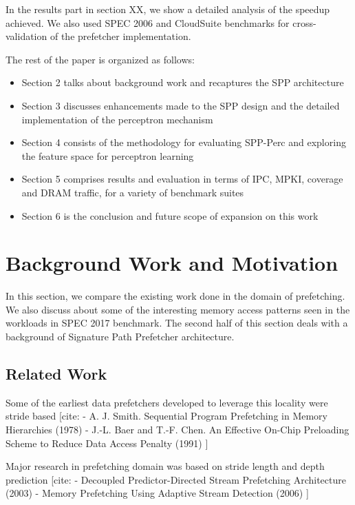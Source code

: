\documentclass{sig-alternate}
\begin{document}
In the results part in section XX, we show a detailed analysis of the speedup achieved.
We also used SPEC 2006 and CloudSuite benchmarks for cross-validation of the prefetcher implementation.

\vspace{1ex}The rest of the paper is organized as follows:

\begin{itemize}
\item Section 2 talks about background work and recaptures the SPP architecture
\item Section 3 discusses enhancements made to the SPP design and the detailed implementation of the perceptron mechanism
\item Section 4 consists of the methodology for evaluating SPP-Perc and exploring the feature space for perceptron learning
\item Section 5 comprises results and evaluation in terms of IPC, MPKI, coverage and DRAM traffic, for a variety of benchmark suites
\item Section 6 is the conclusion and future scope of expansion on this work
\end{itemize}

\section{Background Work and Motivation}

In this section, we compare the existing work done in the domain of prefetching. 
We also discuss about some of the interesting memory access patterns seen in the workloads in SPEC 2017 benchmark. 
The second half of this section deals with a background of Signature Path Prefetcher architecture.

\subsection{Related Work}
Some of the earliest data prefetchers developed to leverage this locality were stride based [cite:\newline
- A. J. Smith. Sequential Program Prefetching in Memory Hierarchies (1978)\newline
- J.-L. Baer and T.-F. Chen. An Effective On-Chip Preloading Scheme to Reduce Data Access Penalty (1991)\newline
]\newline

Major research in prefetching domain was based on stride length and depth prediction [cite:\newline
- Decoupled Predictor-Directed Stream Prefetching
Architecture (2003)\newline
- Memory Prefetching Using Adaptive Stream Detection (2006)\newline
]\newline
\end{document}

